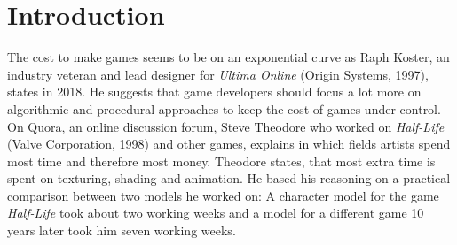 \documentclass[10pt,a4paper]{article}
\begin{document}
\section{Introduction}\label{sec:Introduction}
\begin{multicols}{2}
The cost to make games seems to be on an exponential curve as Raph Koster, an industry veteran and lead designer for \textit{Ultima Online} (Origin Systems, 1997), states in 2018. He suggests that game developers should focus a lot more on algorithmic and procedural approaches to keep the cost of games under control\cite{Koster2018}. On Quora, an online discussion forum, Steve Theodore who worked on \textit{Half-Life} (Valve Corporation, 1998) and other games, explains in which fields artists spend most time and therefore most money. Theodore states, that most extra time is spent on texturing, shading and animation. He based his reasoning on a practical comparison between two models he worked on: A character model for the game \textit{Half-Life} took about two working weeks and a model for a different game 10 years later took him seven working weeks\cite{Prinke2017}.


\end{multicols}
\end{document}
